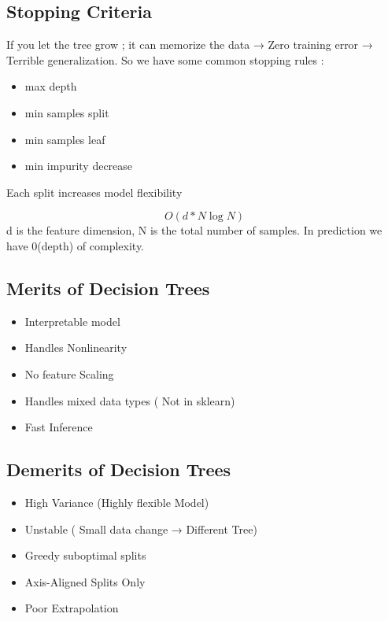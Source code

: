 \documentclass[10pt,a4paper]{article}
\begin{document}
		\subsection{Stopping Criteria}
	
		If you let the tree grow ; it can memorize the data → Zero training error → Terrible generalization. So we have some common stopping rules :
	
		\begin{itemize}
			\item max depth
			\item min samples split
			\item min samples leaf
			\item min impurity decrease
		\end{itemize}
	
		Each split increases model flexibility
	
		$$	O(d * N \log N)
		$$
		d is the feature dimension, N is the total number of samples. In prediction we have 0(depth) of complexity.
	
		\subsection{Merits of Decision Trees}
	
		\begin{itemize}
			\item Interpretable model
			\item Handles Nonlinearity
			\item No feature Scaling
			\item Handles mixed data types ( Not in sklearn)
			\item Fast Inference
		\end{itemize}
	
		\subsection{Demerits of Decision Trees}
	
		\begin{itemize}
			\item High Variance (Highly flexible Model)
			\item Unstable ( Small data change → Different Tree)
			\item Greedy suboptimal splits
			\item Axis-Aligned Splits Only
			\item Poor Extrapolation
		\end{itemize}
	
\end{document}
